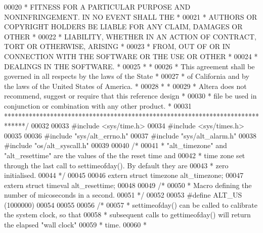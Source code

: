 \begin{DoxyCode}
00020 \textcolor{comment}{* FITNESS FOR A PARTICULAR PURPOSE AND NONINFRINGEMENT. IN NO EVENT SHALL THE *}
00021 \textcolor{comment}{* AUTHORS OR COPYRIGHT HOLDERS BE LIABLE FOR ANY CLAIM, DAMAGES OR OTHER      *}
00022 \textcolor{comment}{* LIABILITY, WHETHER IN AN ACTION OF CONTRACT, TORT OR OTHERWISE, ARISING     *}
00023 \textcolor{comment}{* FROM, OUT OF OR IN CONNECTION WITH THE SOFTWARE OR THE USE OR OTHER         *}
00024 \textcolor{comment}{* DEALINGS IN THE SOFTWARE.                                                   *}
00025 \textcolor{comment}{*                                                                             *}
00026 \textcolor{comment}{* This agreement shall be governed in all respects by the laws of the State   *}
00027 \textcolor{comment}{* of California and by the laws of the United States of America.              *}
00028 \textcolor{comment}{*                                                                             *}
00029 \textcolor{comment}{* Altera does not recommend, suggest or require that this reference design    *}
00030 \textcolor{comment}{* file be used in conjunction or combination with any other product.          *}
00031 \textcolor{comment}{******************************************************************************/}
00032 
00033 \textcolor{preprocessor}{#include <sys/time.h>}
00034 \textcolor{preprocessor}{#include <sys/times.h>}
00035 
00036 \textcolor{preprocessor}{#include "sys/alt_errno.h"}
00037 \textcolor{preprocessor}{#include "sys/alt_alarm.h"}
00038 \textcolor{preprocessor}{#include "os/alt_syscall.h"}
00039 
00040 \textcolor{comment}{/*}
00041 \textcolor{comment}{ * "alt\_timezone" and "alt\_resettime" are the values of the the reset time and}
00042 \textcolor{comment}{ * time zone set through the last call to settimeofday(). By default they are}
00043 \textcolor{comment}{ * zero initialised.}
00044 \textcolor{comment}{ */}
00045 
00046 \textcolor{keyword}{extern} \textcolor{keyword}{struct }timezone alt_timezone;
00047 \textcolor{keyword}{extern} \textcolor{keyword}{struct }timeval  alt_resettime;
00048 
00049 \textcolor{comment}{/*}
00050 \textcolor{comment}{ * Macro defining the number of micoseconds in a second.}
00051 \textcolor{comment}{ */}
00052 
00053 \textcolor{preprocessor}{#define ALT\_US (1000000)}
00054 
00055 
00056 \textcolor{comment}{/*}
00057 \textcolor{comment}{ * settimeofday() can be called to calibrate the system clock, so that }
00058 \textcolor{comment}{ * subsequent calls to gettimeofday() will return the elapsed "wall clock" }
00059 \textcolor{comment}{ * time.}
00060 \textcolor{comment}{ *}

\end{DoxyCode}
